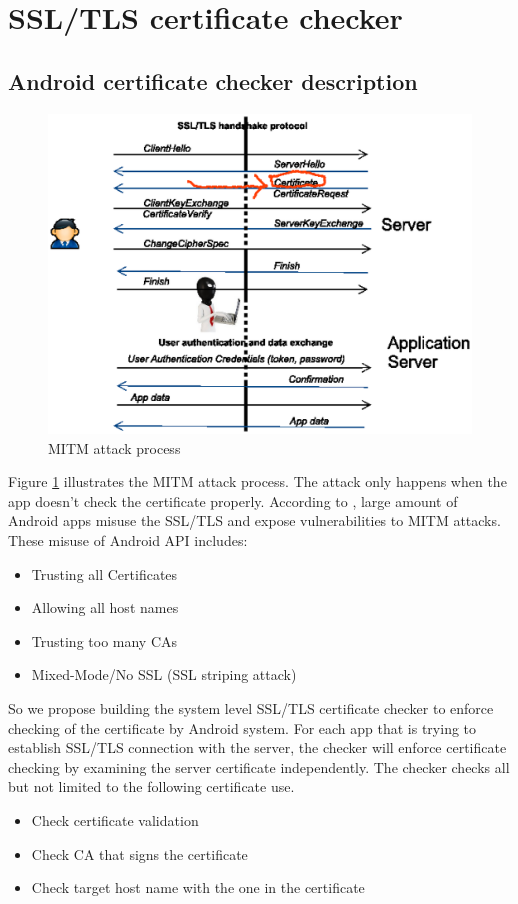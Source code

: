 \documentclass[a4paper, 12pt]{article}
\begin{document}
\section{SSL/TLS certificate checker}
\subsection{Android certificate checker description}

\begin{figure}[!htb]
\centering
\includegraphics[scale=.5]{imgs/mitm_attack}
\caption{MITM attack process}
\label{fig:mitm}
\end{figure}
Figure \ref{fig:mitm} illustrates the MITM attack process. The attack only happens when the app doesn't check the 
certificate properly. According to \cite{fahl2012eve}, large amount of Android apps misuse the SSL/TLS and expose vulnerabilities to MITM attacks. These misuse of Android API includes:
\begin{itemize}
\item  Trusting all Certificates
\item Allowing all host names
\item Trusting too many CAs
\item Mixed-Mode/No SSL (SSL striping attack)
\end{itemize}
So we propose building the system level SSL/TLS certificate checker to enforce checking of the certificate by Android system.
For each app that is trying to establish SSL/TLS connection with the server, the checker will enforce certificate 
checking by examining the server certificate independently. The checker checks all but not limited to the following certificate use.
\begin{itemize}
\item Check certificate validation
\item Check CA that signs the certificate
\item Check target host name with the one in the certificate
\end{itemize}
\end{document}
